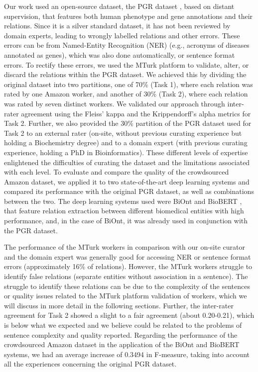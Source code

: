 Our work used an open-source dataset, the PGR dataset \citep{sousa2019silver}, based on distant supervision, that features both human phenotype and gene annotations and their relations. Since it is a silver standard dataset, it has not been reviewed by domain experts, leading to wrongly labelled relations and other errors. These errors can be from Named-Entity Recognition (NER) (e.g., acronyms of diseases annotated as genes), which was also done automatically, or sentence format errors. To rectify these errors, we used the MTurk platform to validate, alter, or discard the relations within the PGR dataset. We achieved this by dividing the original dataset into two partitions, one of 70\% (Task 1), where each relation was rated by one Amazon worker, and another of 30\% (Task 2), where each relation was rated by seven distinct workers. We validated our approach through inter-rater agreement using the Fleiss’ kappa \citep{mchugh2012interrater} and the  Krippendorff’s alpha \citep{krippendorff2011computing} metrics for Task 2. Further, we also provided the 30\% partition of the PGR dataset used for Task 2 to an external rater (on-site, without previous curating experience but holding a Biochemistry degree) and to a domain expert (with previous curating experience, holding a PhD in Bioinformatics). These different levels of expertise enlightened the difficulties of curating the dataset and the limitations associated with each level. To evaluate and compare the quality of the crowdsourced Amazon dataset, we applied it to two state-of-the-art deep learning systems and compared its performance with the original PGR dataset, as well as combinations between the two. The deep learning systems used were BiOnt \citep{sousa2020biont} and BioBERT \citep{lee2020biobert}, that feature relation extraction between different biomedical entities with high performance, and, in the case of BiOnt, it was already used in conjunction with the PGR dataset. 

The performance of the MTurk workers in comparison with our on-site curator and the domain expert was generally good for accessing NER or sentence format errors (approximately 16\% of relations). However, the MTurk workers struggle to identify false relations (separate entities without association in a sentence). The struggle to identify these relations can be due to the complexity of the sentences or quality issues related to the MTurk platform validation of workers, which we will discuss in more detail in the following sections. Further, the inter-rater agreement for Task 2 showed a slight to a fair agreement (about 0.20-0.21), which is below what we expected and we believe could be related to the problems of sentence complexity and quality reported.  Regarding the performance of the crowdsourced Amazon dataset in the application of the BiOnt and BioBERT systems, we had an average increase of 0.3494 in F-measure, taking into account all the experiences concerning the original PGR dataset. 
 
